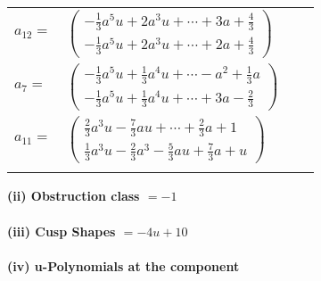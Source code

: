 \documentclass[1p]{elsarticle_modified}
\theoremstyle{definition}
\begin{document}
\begin{tabular}{m{7pt} m{180pt} m{7pt} m{180pt} }
\flushright $a_{12}=$&$\begin{pmatrix}-\frac{1}{3} a^5 u+2 a^3 u+\cdots+3 a+\frac{4}{3}\\-\frac{1}{3} a^5 u+2 a^3 u+\cdots+2 a+\frac{4}{3}\end{pmatrix}$ \\
\flushright $a_{7}=$&$\begin{pmatrix}-\frac{1}{3} a^5 u+\frac{1}{3} a^4 u+\cdots- a^2+\frac{1}{3} a\\-\frac{1}{3} a^5 u+\frac{1}{3} a^4 u+\cdots+3 a-\frac{2}{3}\end{pmatrix}$ \\
\flushright $a_{11}=$&$\begin{pmatrix}\frac{2}{3} a^3 u-\frac{7}{3} a u+\cdots+\frac{2}{3} a+1\\\frac{1}{3} a^3 u-\frac{2}{3} a^3-\frac{5}{3} a u+\frac{7}{3} a+u\end{pmatrix}$\\&\end{tabular}
\flushleft \textbf{(ii) Obstruction class $= -1$}\\~\\
\flushleft \textbf{(iii) Cusp Shapes $= -4 u+10$}\\~\\
\newpage\renewcommand{\arraystretch}{1}
\flushleft \textbf{(iv) u-Polynomials at the component}\newline \\
\end{document}
